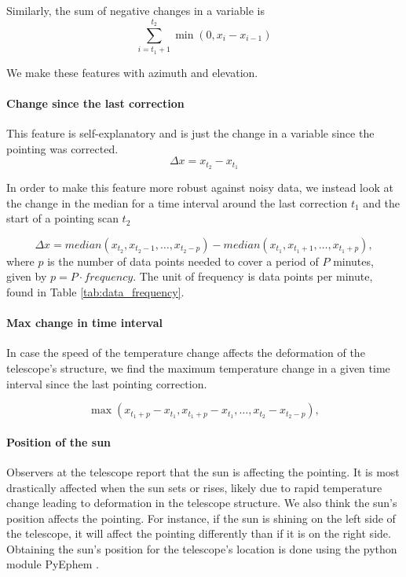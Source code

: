 Similarly, the sum of negative changes in a variable is
\begin{equation}\label{eq:negative_int}
    \sum_{i=t_1+1}^{t_2} \min(0, x_i-x_{i-1})
\end{equation}

We make these features with azimuth and elevation.

\paragraph{Change since the last correction}
This feature is self-explanatory and is just the change in a variable since the pointing was corrected.
\begin{equation}
    \Delta x = x_{t_2} - x_{t_1}
\end{equation}

In order to make this feature more robust against noisy data,
we instead look at the change in the median for a time interval around the last correction $t_1$ and the start of a pointing scan $t_2$

\begin{equation}
    \Delta x = \textit{median}(x_{t_2}, x_{t_2 - 1}, \dots, x_{t_2- p}) - \textit{median}(x_{t_1}, x_{t_1 + 1}, \dots, x_{t_1 + p}),
\end{equation}
where $p$ is the number of data points needed to cover a period of $P$ minutes, given by $p = P \cdot frequency$. The unit of frequency is data points per minute, found in Table \ref{tab:data_frequency}.

\paragraph{Max change in time interval}
In case the speed of the temperature change affects the deformation of the telescope's structure, we find the maximum temperature change in a given time interval since the last pointing correction.

\begin{equation}
    \max (x_{t_1+p} - x_{t_1}, x_{t_1+p} - x_{t_1}, \dots, x_{t_2} - x_{t_2-p}),
\end{equation}


\paragraph{Position of the sun}
Observers at the telescope report that the sun is affecting the pointing.
It is most drastically affected when the sun sets or rises, likely due to rapid temperature change leading to deformation in the telescope structure.
We also think the sun's position affects the pointing.
For instance, if the sun is shining on the left side of the telescope, it will affect the pointing differently than if it is on the right side.
Obtaining the sun's position for the telescope's location is done using the python module PyEphem \cite{ephem}.

